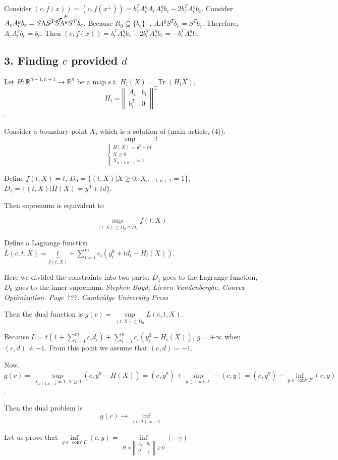 \documentclass[a4paper]{article}
\DeclareMathOperator{\Tr}{Tr}
\DeclareMathOperator{\conv}{conv}
\begin{document}
Consider $(c,f(x))=(c,f(x^\bot))=b_c^TA_c^gA_cA_c^gb_c-2b_c^TA_c^gb_c$. Consider $A_cA_c^gb_c=S\Lambda \cancelto{E}{S^TS}\Lambda^gS^Tb_c$. Because $R_0\subseteq\{b_c\}^\bot$, $\Lambda\Lambda^gS^Tb_c=S^Tb_c$. Therefore, $A_cA_c^gb_c=b_c$. Then $(c,f(x))=b_c^TA_c^gb_c-2b_c^TA_c^gb_c=\boxed{-b_c^TA_c^gb_c}$

\subsection*{3. Finding $c$ provided $d$}
Let $H\colon \mathbb{R}^{n+1, n+1}\to \mathbb{R}^n$ be a map s.t. $H_i(X)=\Tr(H_iX)$, $$H_i=\left|\left|
\begin{array}{cc}
A_i & b_i\\
b_i^T & 0
\end{array}
\right|\right|^{\Box}$$.

Consider a boundary point $X$, which is a solution of (main article, (4)):
$$\boxed{\sup\limits_{\begin{cases}
H(X)=y^0+td\\
X\geqslant 0\\
X_{n+1,n+1}=1
	\end{cases}} t}$$

Define $f(t,X)=t$, $D_0=\{(t,X)\big| X\geqslant 0,\, X_{n+1,n+1}=1 \}$, $D_1=\{(t,X)\big| H(X)=y^0+td\}$.

Then supremum is equivalent to

$$\sup\limits_{(t,X)\in D_0\cap D_1}f(t,X)$$

Define a Lagrange function $L(c,t,X)=\underbrace{t}_{f(t,X)}+\sum\limits_{i=1}^m c_i(y^0_i+td_i-H_i(X))$.

Here we divided the constraints into two parts: $D_1$ goes to the Lagrange function, $D_0$ goes to the inner supremum. {\em Stephen Boyd, Lieven Vandenberghe. Convex Optimization. Page ???. Cambridge University Press}

Then the dual function is $g(c)=\sup\limits_{(t,X)\in D_0} L(c,t,X)$.

Because $L=t(1+\sum\limits_{i=1}^m c_id_i)+\sum\limits_{i=1}^n c_i(y^0_i-H_i(X))$, $g=+\infty$ when $(c,d)\neq -1$. From this point we assume that $\boxed{(c,d)=-1}$.

Now, $g(c)=\sup\limits_{X_{n+1,n+1}=1,X\geqslant 0} (c,y^0-H(X))=(c,y^0)+\sup\limits_{y\in\conv F} -(c,y)=(c,y^0)-\inf\limits_{y\in\conv F} (c,y)$.

Then the dual problem is
$$g(c)\to\inf\limits_{(c,d)=-1}$$

Let us prove that $\inf\limits_{y\in\conv F} (c,y)=\inf\limits_{H=\left|\left|
\begin{array}{cc}
A_c & b_c\\
b_c^T&\gamma
\end{array}
\right|\right|\geqslant 0}(-\gamma)$
\end{document}
